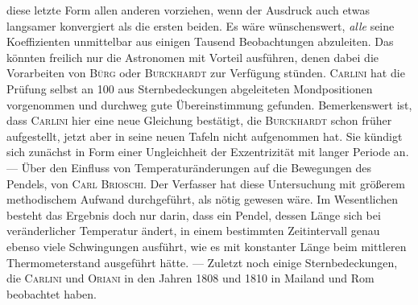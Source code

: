 diese letzte Form allen anderen vorziehen, wenn der Ausdruck auch etwas langsamer konvergiert als die ersten beiden. Es wäre wünschenswert, \emph{alle} seine Koeffizienten unmittelbar aus einigen Tausend Beobachtungen abzuleiten. Das könnten freilich nur die Astronomen mit Vorteil ausführen, denen dabei die Vorarbeiten von \textsc{Bürg} oder \textsc{Burckhardt} zur Verfügung stünden. \textsc{Carlini} hat die Prüfung selbst an 100 aus Sternbedeckungen abgeleiteten Mondpositionen vorgenommen und durchweg gute Übereinstimmung gefunden. Bemerkenswert ist, dass \textsc{Carlini} hier eine neue Gleichung bestätigt, die \textsc{Burckhardt} schon früher aufgestellt, jetzt aber in seine neuen Tafeln nicht aufgenommen hat. Sie kündigt sich zunächst in Form einer Ungleichheit der Exzentrizität mit langer Periode an. --- Über den Einfluss von Temperaturänderungen auf die Bewegungen des Pendels, von \textsc{Carl Brioschi}. Der Verfasser hat diese Untersuchung mit größerem methodischem Aufwand durchgeführt, als nötig gewesen wäre. Im Wesentlichen besteht das Ergebnis doch nur darin, dass ein Pendel, dessen Länge sich bei veränderlicher Temperatur ändert, in einem bestimmten Zeitintervall genau ebenso viele Schwingungen ausführt, wie es mit konstanter Länge beim mittleren Thermometerstand ausgeführt hätte. --- Zuletzt noch einige Sternbedeckungen, die \textsc{Carlini} und \textsc{Oriani} in den Jahren 1808 und 1810 in Mailand und Rom beobachtet haben.

